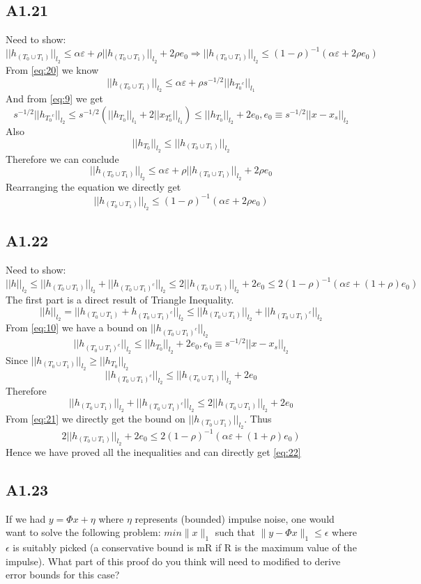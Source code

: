 \documentclass{article}
\newcommand{\lone}[1]{
  ||#1||_{l_1}
}
\newcommand{\ltwo}[1]{
  ||#1||_{l_2}
}
\newcommand{\htc}[1]{
  h_{{#1}^c}
}
\newcommand{\hto}[1]{
  h_{#1}
}
\newcommand{\htzo}{
  h_{(T_0 \cup T_1)}
}
\newcommand{\htzoc}{
  h_{(T_0 \cup T_1)^c}
}
\begin{document}
\subsection*{A1.21}
Need to show:
\begin{equation}
  \label{eq:21}
  \ltwo{\htzo} \le \alpha \varepsilon + \rho \ltwo{\htzo} + 2\rho e_0 \Rightarrow \ltwo{\htzo} \le (1-\rho)^{-1}(\alpha \varepsilon + 2\rho e_0)
\end{equation}
From \ref{eq:20} we know
$$\ltwo{\htzo} \le \alpha \varepsilon + \rho s^{-1/2}\lone{\htc{T_0}}$$
And from \ref{eq:9} we get
$$ s^{-1/2} \ltwo{\htc{T_0}} \le s^{-1/2}(\lone{\hto{T_0}} + 2\lone{x_{T_0^c}}) \le \ltwo{\hto{T_0}} + 2e_0, e_0 \equiv s^{-1/2}\ltwo{x-x_s}$$
Also
$$\ltwo{\hto{T_0}} \le \ltwo{\htzo}$$
Therefore we can conclude
$$\ltwo{\htzo} \le \alpha \varepsilon + \rho \ltwo{\htzo} + 2\rho e_0$$
Rearranging the equation we directly get 
$$\ltwo{\htzo} \le (1-\rho)^{-1}(\alpha \varepsilon + 2\rho e_0)$$
\subsection*{A1.22}
Need to show:
\begin{equation}
  \label{eq:22}
  \ltwo{h} \le \ltwo{\htzo} + \ltwo{\htzoc} \le 2\ltwo{\htzo} + 2e_0 \le 2(1-\rho)^{-1}(\alpha\varepsilon + (1+\rho)e_0)
\end{equation}
The first part is a direct result of Triangle Inequality.
$$\ltwo{h} = \ltwo{\htzo + \htzoc} \le \ltwo{\htzo} + \ltwo{\htzoc}$$
From \ref{eq:10} we have a bound on $\ltwo{\htzoc}$
$$\ltwo{\htzoc} \le \ltwo{\hto{T_0}} + 2e_0, e_0 \equiv s^{-1/2}\ltwo{x - x_s}$$
Since $\ltwo{\htzo} \ge \ltwo{\hto{T_0}}$
$$\ltwo{\htzoc} \le \ltwo{\htzo} + 2e_0$$
Therefore
$$\ltwo{\htzo} + \ltwo{\htzoc} \le 2\ltwo{\htzo} + 2e_0$$
From \ref{eq:21} we directly get the bound on $\ltwo{\htzo}$. Thus
$$2\ltwo{\htzo} + 2e_0 \le 2(1-\rho)^{-1}(\alpha\varepsilon + (1+\rho)e_0)$$
Hence we have proved all the inequalities and can directly get \ref{eq:22}

\subsection*{A1.23}
If we had $y = \Phi x + \eta$ where $\eta$ represents (bounded) impulse noise, one would want to solve the following problem:
$min \|x\|_1$ such that
$\|y - \Phi x\|_1 \leq \epsilon$
where $\epsilon$ is suitably picked (a conservative bound is mR if R is the maximum value of the impulse). 
What part of this proof do you think will need to modified to derive error bounds for this case?
\end{document}
